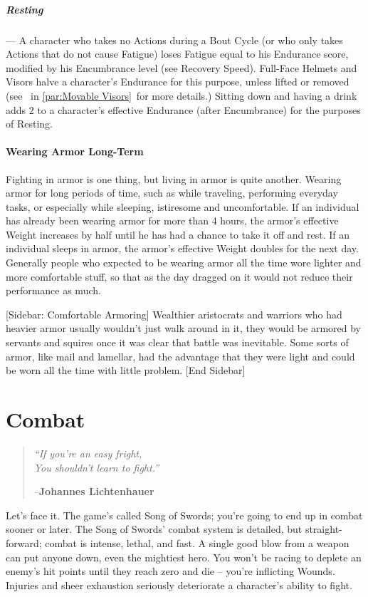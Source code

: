 \documentclass[oneside,11pt,english]{book}
\begin{document}
\paragraph{Resting}---\quad
A character who takes no Actions during a Bout Cycle (or who only takes Actions that do not cause 
Fatigue) loses Fatigue equal to his Endurance score, modified by his Encumbrance level (see Recovery 
Speed). Full-Face Helmets and Visors halve a character’s Endurance for this purpose, unless lifted or
removed (see ~in \autoref{par:Movable Visors}~for more details.)
Sitting down and having a drink adds 2 to a character’s effective Endurance (after Encumbrance) for the 
purposes of Resting. 


\subsubsection{Wearing Armor Long-Term}
Fighting in armor is one thing, but living in armor is quite another. Wearing armor for long periods of 
time, such as while traveling, performing everyday tasks, or especially while sleeping, istiresome and 
uncomfortable. 
If an individual has already been wearing armor for more than 4 hours, the armor’s effective Weight 
increases by half until he has had a chance to take it off and rest. 
If an individual sleeps in armor, the armor’s effective Weight doubles for the next day. 
Generally people who expected to be wearing armor all the time wore lighter and more comfortable stuff, 
so that as the day dragged on it would not reduce their performance as much. 


[Sidebar: Comfortable Armoring] 
Wealthier aristocrats and warriors who had heavier armor usually wouldn’t just walk around in it, they 
would be armored by servants and squires once it was clear that battle was inevitable. Some sorts of 
armor, like mail and lamellar, had the advantage that they were light and could be worn all the time with 
little problem. 
[End Sidebar] 


\chapter{Combat}\label{ch:combat}
\startcontents[chapters]
\clearpage
\begin{quote}
  \centering
  \emph{“If you’re an easy fright,\\
    You shouldn’t learn to fight.”}\par
  \hfill--\textbf{Johannes Lichtenhauer}
\end{quote}
Let’s face it. The game’s called Song of Swords; you’re going to end up in combat sooner or later. The Song of Swords’ combat system is detailed, but straight-forward; combat is intense, lethal, and fast. A
single good blow from a weapon can put anyone down, even the mightiest hero. You won’t be racing to
deplete an enemy’s hit points until they reach zero and die -- you’re inflicting Wounds. Injuries and sheer
exhaustion seriously deteriorate a character’s ability to fight.
\end{document}
